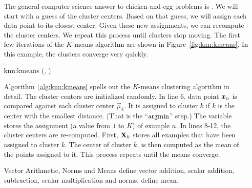The general computer science answer to chicken-and-egg problems is
.  We will start with a guess of the cluster
centers.  Based on that guess, we will assign each data point to its
closest center.  Given these new assignments, we can recompute the
cluster centers.  We repeat this process until clusters stop moving.
The first few iterations of the $K$-means algorithm are shown in
Figure~\ref{fig:knn:kmeans}.  In this example, the clusters converge
very quickly.

\newalgorithm%
  {knn:kmeans}%
  {(, )}
  {
 
\ENDFOR
\REPEAT
{}
\ENDFOR
{}
\ENDFOR
{}
\RETURN {} 
}

Algorithm~\ref{alg:knn:kmeans} spells out the $K$-means clustering
algorithm in detail.  The cluster centers are initialized randomly.
In line 6, data point ${\boldsymbol{x}}_n$ is compared against each cluster center
$\vec\mu_k$.  It is assigned to cluster $k$ if $k$ is the center with
the smallest distance.  (That is the ``$\argmin$'' step.)  The
variable  stores the assignment (a value from $1$ to $K$)
of example $n$.  In lines 8-12, the cluster centers are re-computed.
First, $\text{\bf X}_k$ stores all examples that have been assigned to
cluster $k$.  The center of cluster $k$,  is then
computed as the mean of the points assigned to it.  This process
repeats until the means converge.

\begin{mathreview}{Vector Arithmetic, Norms and Means}
  define vector addition, scalar addition, subtraction, scalar
  multiplication and norms.  define mean.
\end{mathreview}

